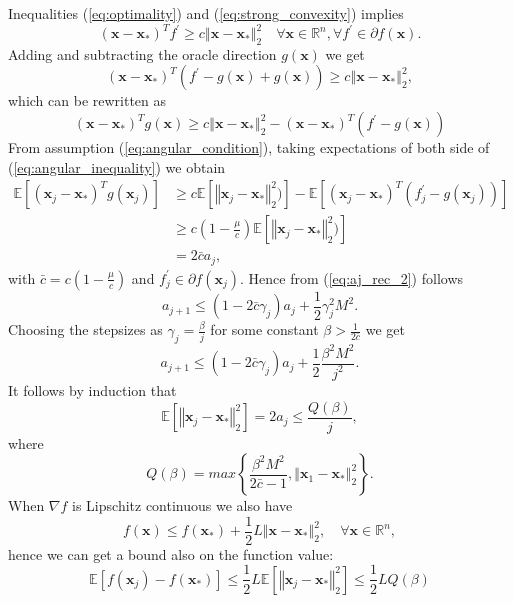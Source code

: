 \documentclass{article}
\renewcommand{\vec}[1]{\boldsymbol{#1}}
\newcommand{\norm}[1]{\left\Vert #1 \right\Vert}
\begin{document}
Inequalities (\ref{eq:optimality}) and (\ref{eq:strong_convexity}) implies
\begin{equation}
	(\vec{x}-\vec{x}_*)^T f^\prime \geq c \norm{\vec{x}-\vec{x}_*}^2_2 \quad \forall \vec{x} \in \mathbb{R}^n, \forall f^\prime\in\partial f(\vec{x}).
\end{equation}
Adding and subtracting the oracle direction $g(\vec{x})$ we get
\begin{equation}
	(\vec{x}-\vec{x}_*)^T (f^\prime -g(\vec{x}) +g(\vec{x})) \geq c \norm{\vec{x}-\vec{x}_*}^2_2,
\end{equation}
which can be rewritten as
\begin{equation}
		(\vec{x}-\vec{x}_*)^T g(\vec{x}) \geq c \norm{\vec{x}-\vec{x}_*}^2_2 - (\vec{x}-\vec{x}_*)^T (f^\prime -g(\vec{x}))
		\label{eq:angular_inequality}
\end{equation}
From assumption (\ref{eq:angular_condition}), taking expectations of both side of (\ref{eq:angular_inequality}) we obtain
\begin{align}
\mathbb{E}[(\vec{x}_j-\vec{x}_*)^T g(\vec{x}_j)] &\geq c \mathbb{E}[\norm{\vec{x}_j-\vec{x}_*}^2_2)] - \mathbb{E}[(\vec{x}_j-\vec{x}_*)^T (f_j^\prime -g(\vec{x}_j))]\\
 &\geq c(1-\frac{\mu }{c}) \mathbb{E}[\norm{\vec{x}_j-\vec{x}_*}^2_2)]\\
 & = 2\bar{c}a_j,
\end{align}
with $\bar{c}=c(1-\frac{\mu }{c})$ and $f_j^\prime \in \partial f(\vec{x}_j)$.
Hence from (\ref{eq:aj_rec_2}) follows 
\begin{equation}
	a_{j+1} \leq (1-2\bar{c}\gamma_j)a_j + \frac{1}{2}\gamma_j^2M^2.
\end{equation}
Choosing the stepsizes as $\gamma_j = \frac{\beta}{j}$ for some constant $\beta>\frac{1}{2\bar{c}}$ we get
\begin{equation}
		a_{j+1} \leq (1-2\bar{c}\gamma_j)a_j + \frac{1}{2}\frac{\beta^2M^2}{j^2}.
\end{equation}
It follows by induction that
\begin{equation}
	\mathbb{E}[\norm{\vec{x}_j - \vec{x}_*}^2_2] = 2a_j\leq \frac{Q(\beta)}{j},
\end{equation}
where 
\begin{equation}
	Q(\beta) = max\left\{\frac{\beta^2M^2}{2\bar{c}-1},\norm{\vec{x}_1 - \vec{x}_*}^2_2 \right\}.
\end{equation}
When $\nabla f$ is Lipschitz continuous we also have
\begin{equation}
	f(\vec{x})\leq f(\vec{x}_*) + \frac{1}{2}L\norm{\vec{x} - \vec{x}_*}^2_2, \quad \forall \vec{x} \in \mathbb{R}^n,
\end{equation}
hence we can get a bound also on the function value:
\begin{equation}
	\mathbb{E}[f(\vec{x}_j)-f(\vec{x}_*)] \leq \frac{1}{2} L \mathbb{E}[\norm{\vec{x}_j - \vec{x}_*}^2_2] \leq \frac{1}{2}LQ(\beta)
\end{equation}
\end{document}
